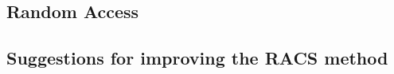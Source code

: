 \documentclass[Main]{subfiles}
\begin{document}
			

		


		\subsection{Random Access} %
		\label{sub:random_access}
		



		\subsection{Suggestions for improving the RACS method} %
		\label{sub:suggestions_for_improving_the_racs_method}
		



\end{document}
